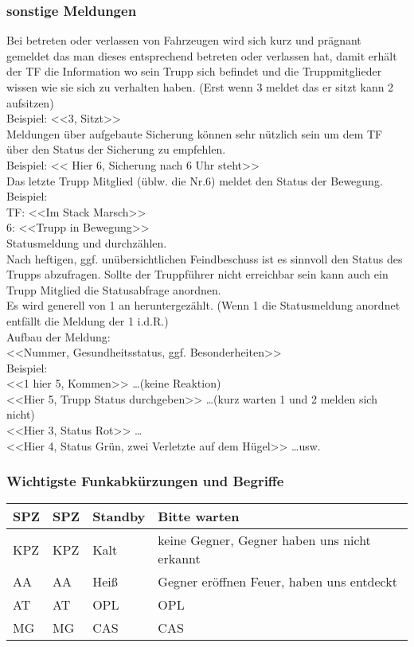 \subsubsection{sonstige Meldungen}
	Bei betreten oder verlassen von Fahrzeugen wird sich kurz und prägnant gemeldet das man dieses entsprechend betreten oder verlassen hat, damit erhält der TF die Information wo sein Trupp sich befindet und die Truppmitglieder wissen wie sie sich zu verhalten haben. (Erst wenn 3 meldet das er sitzt kann 2 aufsitzen) \\
	Beispiel:  <<3, Sitzt>> \\

	Meldungen über aufgebaute Sicherung können sehr nützlich sein um dem TF über den Status der Sicherung zu empfehlen. \\
	Beispiel: << Hier 6, Sicherung nach 6 Uhr steht>> \\

	Das letzte Trupp Mitglied (üblw. die Nr.6) meldet den Status der Bewegung. \\
	Beispiel: \\
	TF: <<Im Stack Marsch>> \\
	6: <<Trupp in Bewegung>>  \\
	Statusmeldung und durchzählen. \\
	Nach heftigen, ggf. unübersichtlichen Feindbeschuss ist es sinnvoll den Status des Trupps abzufragen. Sollte der Truppführer nicht erreichbar sein kann auch ein Trupp Mitglied die Statusabfrage anordnen. \\
	Es wird generell von 1 an heruntergezählt. (Wenn 1 die Statusmeldung  anordnet entfällt die Meldung der 1 i.d.R.)  \\
	Aufbau der Meldung: \\
	<<Nummer, Gesundheitsstatus, ggf. Besonderheiten>>  \\
	Beispiel:\\
	 <<1 hier 5, Kommen>> \dots (keine Reaktion)\\  
	 <<Hier 5, Trupp Status durchgeben>> \dots (kurz warten 1 und 2 melden sich nicht)\\ <<Hier 3, Status Rot>> \dots\\ 
	 <<Hier 4, Status Grün, zwei Verletzte auf dem Hügel>> \dots usw. \\

\subsubsection{Wichtigste Funkabkürzungen und Begriffe}
	\begin{tabular}{|p{2cm}|p{4cm}||p{3cm}|p{4cm}|} \hline
		\acs{SPZ}	& \acl{SPZ}	& Standby	& Bitte warten \\ \hline 
		\acs{KPZ}	& \acl{KPZ}	& Kalt		& keine Gegner, Gegner haben uns nicht erkannt \\ \hline
		\acs{AA}	& \acl{AA}	& Heiß 		& Gegner eröffnen Feuer, haben uns entdeckt \\ \hline
		\acs{AT}	& \acl{AT}	& \acs{OPL}	& \acl{OPL} \\ \hline
		\acs{MG}	& \acl{MG}	& \acs{CAS}	& \acl{CAS} \\ \hline
	\end{tabular}


